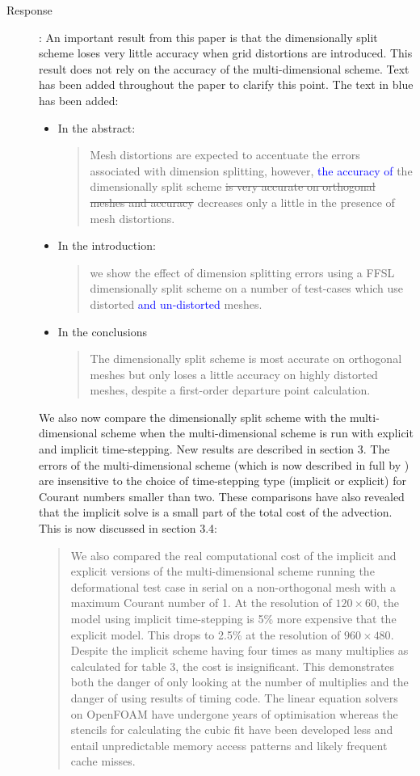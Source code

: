 \documentclass[12pt]{article}
\begin{document}
\begin{description}
\item [Response]:
An important result from this paper is that the dimensionally split scheme loses very little accuracy when grid distortions are introduced. This result does not rely on the accuracy of the multi-dimensional scheme. Text has been added throughout the paper to clarify this point. The text in blue has been added:
\begin{itemize}
\item In the abstract:
\begin{quote}
Mesh distortions are expected to accentuate the errors associated with dimension splitting, however, \textcolor{blue}{the accuracy of} the dimensionally split scheme \sout{is very accurate on orthogonal meshes and accuracy} decreases only a little in the presence of mesh distortions.
\end{quote}
\item In the introduction:
\begin{quote}
we show the effect of dimension splitting errors using a FFSL dimensionally split scheme on a number of test-cases which use distorted \textcolor{blue}{and un-distorted} meshes.
\end{quote}
\item In the conclusions
\begin{quote}
The dimensionally split scheme is most accurate on orthogonal meshes but only loses a little accuracy on highly distorted meshes, despite a first-order departure point calculation.
\end{quote}
\end{itemize}

We also now compare the dimensionally split scheme with the multi-dimensional scheme when the multi-dimensional scheme is run with explicit and implicit time-stepping. New results are described in section 3. The errors of the multi-dimensional scheme (which is now described in full by \cite{SWMD17}) are insensitive to the choice of time-stepping type (implicit or explicit) for Courant numbers smaller than two. These comparisons have also revealed that the implicit solve is a small part of the total cost of the advection. This is now discussed in section 3.4:

\begin{quote}
We also compared the real computational cost of the implicit and explicit versions of the multi-dimensional scheme running the deformational test case in serial on a non-orthogonal mesh with a maximum Courant number of 1. At the resolution of $120\times 60$, the model using implicit time-stepping is 5\% 
more expensive that the explicit model. This drops to 2.5\%
at the resolution of $960\times 480$. Despite the implicit scheme having four times as many multiplies as calculated for table 3, the cost is insignificant. This demonstrates both the danger of only looking at the number of multiplies and the danger of using results of timing code. The linear equation solvers on OpenFOAM have undergone years of optimisation whereas the stencils for calculating the cubic fit have been developed less and entail unpredictable memory access patterns and likely frequent cache misses. 
\end{quote}


\end{description}
\end{document}
